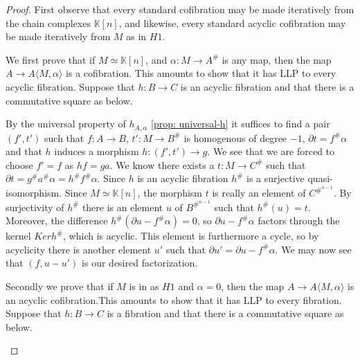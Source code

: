 \documentclass[../thesis.tex]{subfiles}
\begin{document}
            \begin{proof}
                First observe that every standard cofibration may be made iteratively from the chain complexes $\mathbb{K}[n]$, and likewise, every standard acyclic cofibration may be made iteratively from $M$ as in $H1$.

                We first prove that if $M \simeq \mathbb{K}[n]$, and $\alpha : M \rightarrow A^\#$ is any map, then the map $A \rightarrow A\langle M,\alpha\rangle$ is a cofibration. This amounts to show that it has LLP to every acyclic fibration. Suppose that $h: B \rightarrow C$ is an acyclic fibration and that there is a commutative square as below.
                \begin{center}
                \end{center}
                
                By the universal property of $h_{A,\alpha}$ \ref{prop: universal-h} it suffices to find a pair $(f',t')$ such that $f: A \rightarrow B$, $t' : M \rightarrow B^\#$ is homogenous of degree $-1$, $\partial t = f^\#\alpha$ and that $h$ induces a morphism $h : (f',t') \rightarrow g$. We see that we are forced to choose $f' = f$ as $hf = ga$. We know there exists a $t : M \rightarrow C^\#$ such that $\partial t = g^\#a^\#\alpha = h^\#f^\#\alpha$. Since $h$ is an acyclic fibration $h^\#$ is a surjective quasi-isomorphism. Since $M \simeq \mathbb{K}[n]$, the morphism $t$ is really an element of $C^{\#^{n-1}}$. By surjectivity of $h^\#$ there is an element $u$ of $B^{\#^{n-1}}$ such that $h^\#(u) = t$. Moreover, the difference $h^\#(\partial u - f^\#\alpha) = 0$, so $\partial u - f^\#\alpha$ factors through the kernel $Ker h^\#$, which is acyclic. This element is furthermore a cycle, so by acyclicity there is another element $u'$ such that $\partial u' = \partial u - f^\#\alpha$. We may now see that $(f, u - u')$ is our desired factorization.
                
                Secondly we prove that if $M$ is in as $H1$ and $\alpha = 0$, then the map $A \rightarrow A\langle M,\alpha\rangle$ is an acyclic cofibration.This amounts to show that it has LLP to every fibration. Suppose that $h: B \rightarrow C$ is a fibration and that there is a commutative square as below.
                \begin{center}
                \end{center}


\end{proof}
\end{document}
